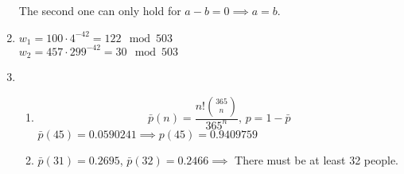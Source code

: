 \documentclass[a4paper,12pt]{extarticle}
\begin{document}
\begin{enumerate}
    The second one can only hold for $a-b=0 \implies a=b$.
  \item
    $w_1=100\cdot4^{-42}=122 \mod 503$\\
    $w_2=457\cdot299^{-42}=30 \mod 503$
  \item
    \begin{enumerate}
      \item
        \[\bar{p}(n)=\frac{n!\binom{365}{n}}{365^n},\, p=1-\bar{p}\]
        $\bar{p}(45)=0.0590241\implies p(45)=0.9409759$
      \item
        $\bar{p}(31)=0.2695$, $\bar{p}(32)=0.2466\implies$ There must be at least 32 people.
    \end{enumerate}
    
    
\end{enumerate}
\end{document}
